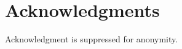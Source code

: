 \documentclass{article}
\begin{document}
\vspace*{-3mm}
\section*{Acknowledgments}
\vspace{-2mm}
Acknowledgment is suppressed for anonymity.
\vspace{-4mm}



\end{document}
